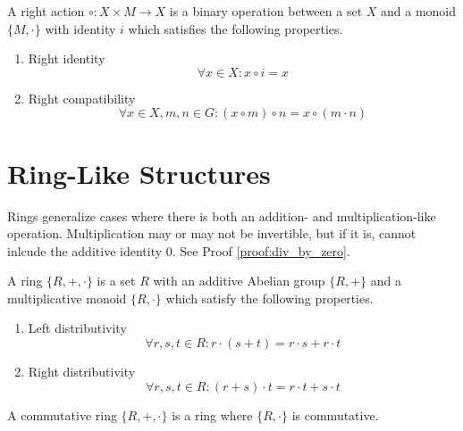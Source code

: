 \begin{definition}
	A right action $\circ: X \times M \rightarrow X$ is a binary operation between a set $X$ and a monoid $\{ M, \cdot \}$ with identity $i$ which satisfies the following properties.
	\begin{enumerate}
		\item Right identity
		\begin{equation}
			\forall x \in X: x \circ i = x
		\end{equation}
		\item Right compatibility
		\begin{equation}
			\forall x \in X, m, n \in G: (x \circ m) \circ n = x \circ (m \cdot n)
		\end{equation}
	\end{enumerate}
\end{definition}

\section{Ring-Like Structures}

Rings generalize cases where there is both an addition- and multiplication-like operation. Multiplication may or may not be invertible, but if it is, cannot inlcude the additive identity 0. See Proof \ref{proof:div_by_zero}.

\begin{definition}[Ring]
	A ring $\{ R, +, \cdot \}$ is a set $R$ with an additive Abelian group $\{ R, + \}$ and a multiplicative monoid $\{ R, \cdot \}$ which satisfy the following properties.
	\begin{enumerate}
		\item Left distributivity
		\begin{equation}
			\forall r, s, t \in R: r \cdot (s + t) = r \cdot s + r \cdot t
		\end{equation}
		\item Right distributivity
		\begin{equation}
			\forall r, s, t \in R: (r + s) \cdot t = r \cdot t + s \cdot t
		\end{equation}
	\end{enumerate}
\end{definition}

\begin{definition}
	A commutative ring $\{ R, +, \cdot \}$ is a ring where $\{ R, \cdot \}$ is commutative.
\end{definition}


